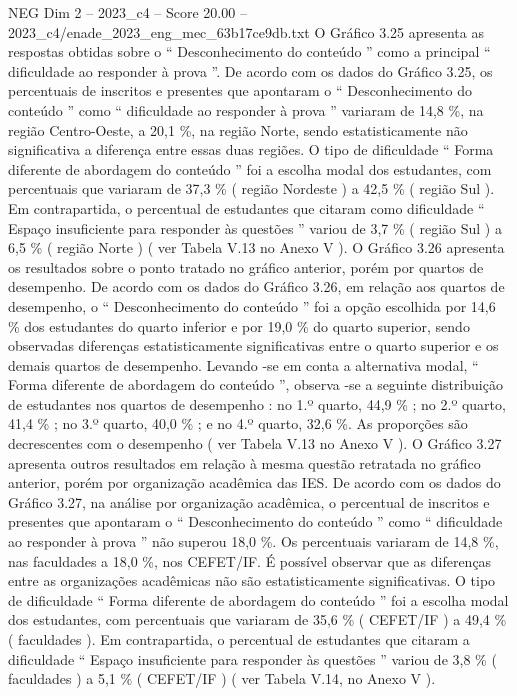 \begin{textsample}{NEG Dim 2 – 2023\_c4 – Score 20.00 – 2023\_c4/enade\_2023\_eng\_mec\_63b17ce9db.txt}
O Gráfico 3.25 apresenta as respostas obtidas sobre o “ Desconhecimento do conteúdo ” como a principal “ dificuldade ao responder à prova ”.
De acordo com os dados do Gráfico 3.25, os percentuais de inscritos e presentes que apontaram o “ Desconhecimento do conteúdo ” como “ dificuldade ao responder à prova ” variaram de 14,8 \%, na região Centro-Oeste, a 20,1 \%, na região Norte, sendo estatisticamente não significativa a diferença entre essas duas regiões.
O tipo de dificuldade “ Forma diferente de abordagem do conteúdo ” foi a escolha modal dos estudantes, com percentuais que variaram de 37,3 \% ( região Nordeste ) a 42,5 \% ( região Sul ).
Em contrapartida, o percentual de estudantes que citaram como dificuldade “ Espaço insuficiente para responder às questões ” variou de 3,7 \% ( região Sul ) a 6,5 \% ( região Norte ) ( ver Tabela V.13 no Anexo V ).
O Gráfico 3.26 apresenta os resultados sobre o ponto tratado no gráfico anterior, porém por quartos de desempenho.
De acordo com os dados do Gráfico 3.26, em relação aos quartos de desempenho, o “ Desconhecimento do conteúdo ” foi a opção escolhida por 14,6 \% dos estudantes do quarto inferior e por 19,0 \% do quarto superior, sendo observadas diferenças estatisticamente significativas entre o quarto superior e os demais quartos de desempenho.
Levando -se em conta a alternativa modal, “ Forma diferente de abordagem do conteúdo ”, observa -se a seguinte distribuição de estudantes nos quartos de desempenho : no 1.º quarto, 44,9 \% ; no 2.º quarto, 41,4 \% ; no 3.º quarto, 40,0 \% ; e no 4.º quarto, 32,6 \%.
As proporções são decrescentes com o desempenho ( ver Tabela V.13 no Anexo V ).
O Gráfico 3.27 apresenta outros resultados em relação à mesma questão retratada no gráfico anterior, porém por organização acadêmica das IES.
De acordo com os dados do Gráfico 3.27, na análise por organização acadêmica, o percentual de inscritos e presentes que apontaram o “ Desconhecimento do conteúdo ” como “ dificuldade ao responder à prova ” não superou 18,0 \%.
Os percentuais variaram de 14,8 \%, nas faculdades a 18,0 \%, nos CEFET/IF.
É possível observar que as diferenças entre as organizações acadêmicas não são estatisticamente significativas.
O tipo de dificuldade “ Forma diferente de abordagem do conteúdo ” foi a escolha modal dos estudantes, com percentuais que variaram de 35,6 \% ( CEFET/IF ) a 49,4 \% ( faculdades ).
Em contrapartida, o percentual de estudantes que citaram a dificuldade “ Espaço insuficiente para responder às questões ” variou de 3,8 \% ( faculdades ) a 5,1 \% ( CEFET/IF ) ( ver Tabela V.14, no Anexo V ).

\end{textsample}
